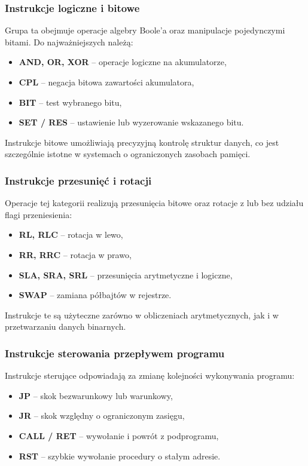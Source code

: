 \documentclass{article}
\begin{document}
\subsubsection{Instrukcje logiczne i bitowe}

Grupa ta obejmuje operacje algebry Boole’a oraz manipulacje pojedynczymi bitami. Do najważniejszych należą:

\begin{itemize}
	\item \textbf{AND, OR, XOR} -- operacje logiczne na akumulatorze,
	\item \textbf{CPL} -- negacja bitowa zawartości akumulatora,
	\item \textbf{BIT} -- test wybranego bitu,
	\item \textbf{SET / RES} -- ustawienie lub wyzerowanie wskazanego bitu.
\end{itemize}

Instrukcje bitowe umożliwiają precyzyjną kontrolę struktur danych, co jest szczególnie istotne w systemach o ograniczonych zasobach pamięci.

\subsubsection{Instrukcje przesunięć i rotacji}

Operacje tej kategorii realizują przesunięcia bitowe oraz rotacje z lub bez udziału flagi przeniesienia:

\begin{itemize}
	\item \textbf{RL, RLC} -- rotacja w lewo,
	\item \textbf{RR, RRC} -- rotacja w prawo,
	\item \textbf{SLA, SRA, SRL} -- przesunięcia arytmetyczne i logiczne,
	\item \textbf{SWAP} -- zamiana półbajtów w rejestrze.
\end{itemize}

Instrukcje te są użyteczne zarówno w obliczeniach arytmetycznych, jak i w przetwarzaniu danych binarnych.

\subsubsection{Instrukcje sterowania przepływem programu}

Instrukcje sterujące odpowiadają za zmianę kolejności wykonywania programu:

\begin{itemize}
	\item \textbf{JP} -- skok bezwarunkowy lub warunkowy,
	\item \textbf{JR} -- skok względny o ograniczonym zasięgu,
	\item \textbf{CALL / RET} -- wywołanie i powrót z podprogramu,
	\item \textbf{RST} -- szybkie wywołanie procedury o stałym adresie.
\end{itemize}
\end{document}

